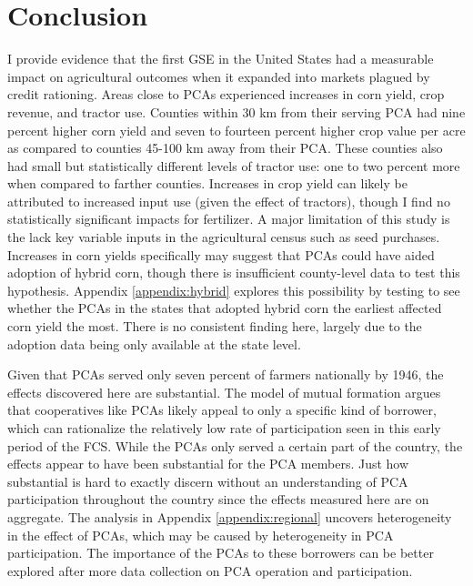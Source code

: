\documentclass[12pt]{article}
\begin{document}
\section*{Conclusion} 
I provide evidence that the first GSE in the United States had a measurable impact on agricultural outcomes when it expanded into markets plagued by credit rationing.
Areas close to PCAs experienced increases in corn yield, crop revenue, and tractor use.
Counties within 30 km from their serving PCA had nine percent higher corn yield and seven to fourteen percent higher crop value per acre as compared to counties 45-100 km away from their PCA.
These counties also had small but statistically different levels of tractor use: one to two percent more when compared to farther counties.
Increases in crop yield can likely be attributed to increased input use (given the effect of tractors), though I find no statistically significant impacts for fertilizer.
A major limitation of this study is the lack key variable inputs in the agricultural census such as seed purchases.
Increases in corn yields specifically may suggest that PCAs could have aided adoption of hybrid corn, though there is insufficient county-level data to test this hypothesis.
Appendix \ref{appendix:hybrid} explores this possibility by testing to see whether the PCAs in the states that adopted hybrid corn the earliest affected corn yield the most.
There is no consistent finding here, largely due to the adoption data being only available at the state level.

Given that PCAs served only seven percent of farmers nationally by 1946, the effects discovered here are substantial.
The \citet{smith_adverse_1990} model of mutual formation argues that cooperatives like PCAs likely appeal to only a specific kind of borrower, which can rationalize the relatively low rate of participation seen in this early period of the FCS.
While the PCAs only served a certain part of the country, the effects appear to have been substantial for the PCA members.
Just how substantial is hard to exactly discern without an understanding of PCA participation throughout the country since the effects measured here are on aggregate.
The analysis in Appendix \ref{appendix:regional} uncovers heterogeneity in the effect of PCAs, which may be caused by heterogeneity in PCA participation.
The importance of the PCAs to these borrowers can be better explored after more data collection on PCA operation and participation.
\end{document}
